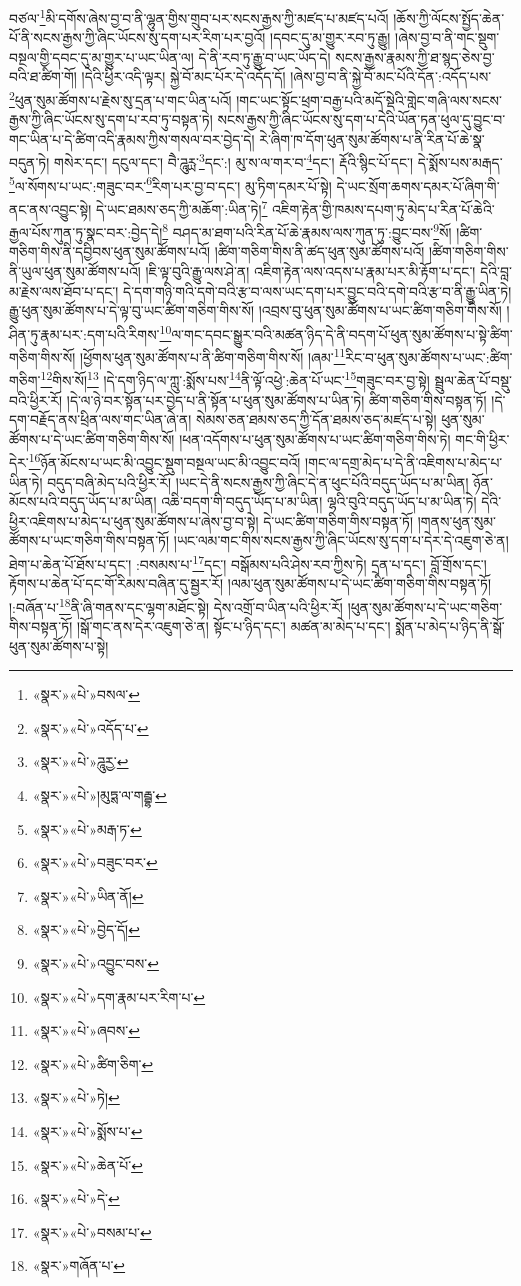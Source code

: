 བཙལ་\footnote{«སྣར་»«པེ་»བསལ་}མི་དགོས་ཞེས་བྱ་བ་ནི་ལྷུན་གྱིས་གྲུབ་པར་སངས་རྒྱས་ཀྱི་མཛད་པ་མཛད་པའོ། །ཆོས་ཀྱི་ལོངས་སྤྱོད་ཆེན་པོ་ནི་སངས་རྒྱས་ཀྱི་ཞིང་ཡོངས་སུ་དག་པར་རིག་པར་བྱའོ། །དབང་དུ་མ་གྱུར་རབ་ཏུ་རྒྱུ། །ཞེས་བྱ་བ་ནི་གང་སྡུག་བསྔལ་གྱི་དབང་དུ་མ་གྱུར་པ་ཡང་ཡིན་ལ། དེ་ནི་རབ་ཏུ་རྒྱུ་བ་ཡང་ཡོད་དེ། སངས་རྒྱས་རྣམས་ཀྱི་ཐ་སྙད་ཅེས་བྱ་བའི་ཐ་ཚིག་གོ། །དེའི་ཕྱིར་འདི་ལྟར། སྐྱེ་བོ་མང་པོར་དེ་འདོད་དོ། །ཞེས་བྱ་བ་ནི་སྐྱེ་བོ་མང་པོའི་དོན་:འདོད་པས་\footnote{«སྣར་»«པེ་»འདོད་པ་}ཕུན་སུམ་ཚོགས་པ་རྗེས་སུ་དྲན་པ་གང་ཡིན་པའོ། །གང་ཡང་སྟོང་ཕྲག་བརྒྱ་པའི་མདོ་སྡེའི་གླེང་གཞི་ལས་སངས་རྒྱས་ཀྱི་ཞིང་ཡོངས་སུ་དག་པ་རབ་ཏུ་བསྟན་ཏེ། སངས་རྒྱས་ཀྱི་ཞིང་ཡོངས་སུ་དག་པ་དེའི་ཡོན་ཏན་ཕུལ་དུ་བྱུང་བ་གང་ཡིན་པ་དེ་ཚིག་འདི་རྣམས་ཀྱིས་གསལ་བར་བྱེད་དེ། རེ་ཞིག་ཁ་དོག་ཕུན་སུམ་ཚོགས་པ་ནི་རིན་པོ་ཆེ་སྣ་བདུན་ཏེ། གསེར་དང་། དངུལ་དང་། བཻ་ཌཱུཪྻ་\footnote{«སྣར་»«པེ་»ཌཱུརྱ་}དང་:། མུ་ས་ལ་གར་བ་\footnote{«སྣར་»«པེ་»།མུཏྶ་ལ་གརྦྷ་}དང་། རྡོའི་སྙིང་པོ་དང་། དེ་སྨོས་པས་མརྒད་\footnote{«སྣར་»«པེ་»མརྒ་ཏ་}ལ་སོགས་པ་ཡང་:གཟུང་བར་\footnote{«སྣར་»«པེ་»བཟུང་བར་}རིག་པར་བྱ་བ་དང་། མུ་ཏིག་དམར་པོ་སྟེ། དེ་ཡང་སྲོག་ཆགས་དམར་པོ་ཞིག་གི་ནང་ནས་འབྱུང་སྟེ། དེ་ཡང་ཐམས་ཅད་ཀྱི་མཆོག་:ཡིན་ཏེ།\footnote{«སྣར་»«པེ་»ཡིན་ནོ།} འཇིག་རྟེན་གྱི་ཁམས་དཔག་ཏུ་མེད་པ་རིན་པོ་ཆེའི་རྒྱལ་པོས་ཀུན་ཏུ་སྣང་བར་:བྱེད་དེ།\footnote{«སྣར་»«པེ་»བྱེད་དོ།} བཤད་མ་ཐག་པའི་རིན་པོ་ཆེ་རྣམས་ལས་ཀུན་ཏུ་:བྱུང་བས་\footnote{«སྣར་»«པེ་»འབྱུང་བས་}སོ། །ཚིག་གཅིག་གིས་ནི་དབྱིབས་ཕུན་སུམ་ཚོགས་པའོ། །ཚིག་གཅིག་གིས་ནི་ཚད་ཕུན་སུམ་ཚོགས་པའོ། །ཚིག་གཅིག་གིས་ནི་ཡུལ་ཕུན་སུམ་ཚོགས་པའོ། །ཇི་ལྟ་བུའི་རྒྱུ་ལས་ཤེ་ན། འཇིག་རྟེན་ལས་འདས་པ་རྣམ་པར་མི་རྟོག་པ་དང་། དེའི་བླ་མ་རྗེས་ལས་ཐོབ་པ་དང་། དེ་དག་གཉི་གའི་དགེ་བའི་རྩ་བ་ལས་ཡང་དག་པར་བྱུང་བའི་དགེ་བའི་རྩ་བ་ནི་རྒྱུ་ཡིན་ཏེ། རྒྱུ་ཕུན་སུམ་ཚོགས་པ་དེ་ལྟ་བུ་ཡང་ཚིག་གཅིག་གིས་སོ། །འབྲས་བུ་ཕུན་སུམ་ཚོགས་པ་ཡང་ཚིག་གཅིག་གིས་སོ། །ཤིན་ཏུ་རྣམ་པར་:དག་པའི་རིགས་\footnote{«སྣར་»«པེ་»དག་རྣམ་པར་རིག་པ་}ལ་གང་དབང་སྒྱུར་བའི་མཚན་ཉིད་དེ་ནི་བདག་པོ་ཕུན་སུམ་ཚོགས་པ་སྟེ་ཚིག་གཅིག་གིས་སོ། །ཕྱོགས་ཕུན་སུམ་ཚོགས་པ་ནི་ཚིག་གཅིག་གིས་སོ། །ཞམ་\footnote{«སྣར་»«པེ་»ཞབས་}རིང་བ་ཕུན་སུམ་ཚོགས་པ་ཡང་:ཚིག་གཅིག་\footnote{«སྣར་»«པེ་»ཚིག་ཅིག་}གིས་སོ།\footnote{«སྣར་»«པེ་»ཏེ།} །དེ་དག་ཉིད་ལ་ཀླུ་:སྨོས་པས་\footnote{«སྣར་»«པེ་»སྨོས་པ་}ནི་ལྟོ་འཕྱེ་:ཆེན་པོ་ཡང་\footnote{«སྣར་»«པེ་»ཆེན་པོ་}གཟུང་བར་བྱ་སྟེ། སྦྲུལ་ཆེན་པོ་བསྡུ་བའི་ཕྱིར་རོ། །དེ་ལ་ཉེ་བར་སྟོན་པར་བྱེད་པ་ནི་སྟོན་པ་ཕུན་སུམ་ཚོགས་པ་ཡིན་ཏེ། ཚིག་གཅིག་གིས་བསྟན་ཏོ། །དེ་དག་བརྗོད་ནས་ཕྲིན་ལས་གང་ཡིན་ཞེ་ན། སེམས་ཅན་ཐམས་ཅད་ཀྱི་དོན་ཐམས་ཅད་མཛད་པ་སྟེ། ཕུན་སུམ་ཚོགས་པ་དེ་ཡང་ཚིག་གཅིག་གིས་སོ། །ཕན་འདོགས་པ་ཕུན་སུམ་ཚོགས་པ་ཡང་ཚིག་གཅིག་གིས་ཏེ། གང་གི་ཕྱིར་དེར་\footnote{«སྣར་»«པེ་»དེ་}ཉོན་མོངས་པ་ཡང་མི་འབྱུང་སྡུག་བསྔལ་ཡང་མི་འབྱུང་བའོ། །གང་ལ་དགྲ་མེད་པ་དེ་ནི་འཇིགས་པ་མེད་པ་ཡིན་ཏེ། བདུད་བཞི་མེད་པའི་ཕྱིར་རོ། །ཡང་དེ་ནི་སངས་རྒྱས་ཀྱི་ཞིང་དེ་ན་ཕུང་པོའི་བདུད་ཡོད་པ་མ་ཡིན། ཉོན་མོངས་པའི་བདུད་ཡོད་པ་མ་ཡིན། འཆི་བདག་གི་བདུད་ཡོད་པ་མ་ཡིན། ལྷའི་བུའི་བདུད་ཡོད་པ་མ་ཡིན་ཏེ། དེའི་ཕྱིར་འཇིགས་པ་མེད་པ་ཕུན་སུམ་ཚོགས་པ་ཞེས་བྱ་བ་སྟེ། དེ་ཡང་ཚིག་གཅིག་གིས་བསྟན་ཏོ། །གནས་ཕུན་སུམ་ཚོགས་པ་ཡང་གཅིག་གིས་བསྟན་ཏོ། །ཡང་ལམ་གང་གིས་སངས་རྒྱས་ཀྱི་ཞིང་ཡོངས་སུ་དག་པ་དེར་དེ་འཇུག་ཅེ་ན། ཐེག་པ་ཆེན་པོ་ཐོས་པ་དང་། :བསམས་པ་\footnote{«སྣར་»«པེ་»བསམ་པ་}དང་། བསྒོམས་པའི་ཤེས་རབ་ཀྱིས་ཏེ། དྲན་པ་དང་། བློ་གྲོས་དང་། རྟོགས་པ་ཆེན་པོ་དང་གོ་རིམས་བཞིན་དུ་སྦྱར་རོ། །ལམ་ཕུན་སུམ་ཚོགས་པ་དེ་ཡང་ཚིག་གཅིག་གིས་བསྟན་ཏོ། །:བཞོན་པ་\footnote{«སྣར་»གཞོན་པ་}ནི་ཞི་གནས་དང་ལྷག་མཐོང་སྟེ། དེས་འགྲོ་བ་ཡིན་པའི་ཕྱིར་རོ། །ཕུན་སུམ་ཚོགས་པ་དེ་ཡང་གཅིག་གིས་བསྟན་ཏོ། །སྒོ་གང་ནས་དེར་འཇུག་ཅེ་ན། སྟོང་པ་ཉིད་དང་། མཚན་མ་མེད་པ་དང་། སྨོན་པ་མེད་པ་ཉིད་ནི་སྒོ་ཕུན་སུམ་ཚོགས་པ་སྟེ། 